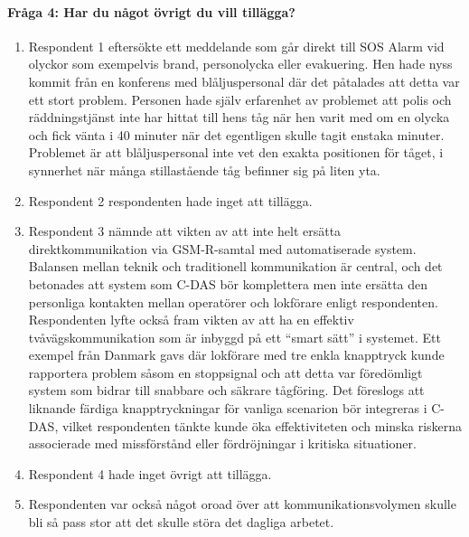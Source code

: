 \paragraph{Fråga 4: Har du något övrigt du vill tillägga?}
\begin{enumerate}
    \item Respondent 1 eftersökte ett meddelande som går direkt till SOS Alarm vid olyckor som exempelvis brand, personolycka eller evakuering.
    Hen hade nyss kommit från en konferens med blåljuspersonal där det påtalades att detta var ett stort problem.
    Personen hade själv erfarenhet av problemet att polis och räddningstjänst inte har hittat till hens tåg när hen varit med om en olycka och fick vänta i 40 minuter när det egentligen skulle tagit enstaka minuter.
    Problemet är att blåljuspersonal inte vet den exakta positionen för tåget, i synnerhet när många stillastående tåg befinner sig på liten yta.
    \item Respondent 2 respondenten hade inget att tillägga.
    \item Respondent 3 nämnde att vikten av att inte helt ersätta direktkommunikation via GSM-R-samtal med automatiserade system.
    Balansen mellan teknik och traditionell kommunikation är central, och det betonades att system som C-DAS bör komplettera men inte ersätta den personliga kontakten mellan operatörer och lokförare enligt respondenten.
    Respondenten lyfte också fram vikten av att ha en effektiv tvåvägskommunikation som är inbyggd på ett “smart sätt” i systemet.
    Ett exempel från Danmark gavs där lokförare med tre enkla knapptryck kunde rapportera problem såsom en stoppsignal och att detta var föredömligt system som bidrar till snabbare och säkrare tågföring.
    Det föreslogs att liknande färdiga knapptryckningar för vanliga scenarion bör integreras i C-DAS, vilket respondenten tänkte kunde öka effektiviteten och minska riskerna associerade med missförstånd eller fördröjningar i kritiska situationer.
    \item Respondent 4 hade inget övrigt att tillägga.
    \item Respondenten var också något oroad över att kommunikationsvolymen skulle bli så pass stor att det skulle störa det dagliga arbetet.
\end{enumerate}